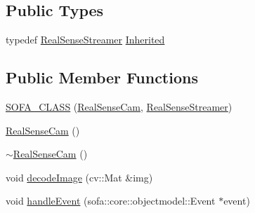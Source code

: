 \subsection*{Public Types}
\begin{DoxyCompactItemize}
\item 
typedef \hyperlink{classsofa_1_1rgbdtracking_1_1_real_sense_streamer}{Real\+Sense\+Streamer} \hyperlink{classsofa_1_1rgbdtracking_1_1_real_sense_cam_a0a77e286d896d3e917359d3e7a3d6c47}{Inherited}
\end{DoxyCompactItemize}
\subsection*{Public Member Functions}
\begin{DoxyCompactItemize}
\item 
\hyperlink{classsofa_1_1rgbdtracking_1_1_real_sense_cam_a32f3a2ac2480dba52c84620583c4d6e3}{S\+O\+F\+A\+\_\+\+C\+L\+A\+SS} (\hyperlink{classsofa_1_1rgbdtracking_1_1_real_sense_cam}{Real\+Sense\+Cam}, \hyperlink{classsofa_1_1rgbdtracking_1_1_real_sense_streamer}{Real\+Sense\+Streamer})
\item 
\hyperlink{classsofa_1_1rgbdtracking_1_1_real_sense_cam_a4d02e83689bde2a5b01acd6d36d1822a}{Real\+Sense\+Cam} ()
\item 
\hyperlink{classsofa_1_1rgbdtracking_1_1_real_sense_cam_affab2e07547f9cc62d07779771e07961}{$\sim$\+Real\+Sense\+Cam} ()
\item 
void \hyperlink{classsofa_1_1rgbdtracking_1_1_real_sense_cam_af0fc64dd75ab34819f1341ce97359634}{decode\+Image} (cv\+::\+Mat \&img)
\item 
void \hyperlink{classsofa_1_1rgbdtracking_1_1_real_sense_cam_abf95b6b7d177c8718c779947e1a19bdc}{handle\+Event} (sofa\+::core\+::objectmodel\+::\+Event $\ast$event)
\end{DoxyCompactItemize}
